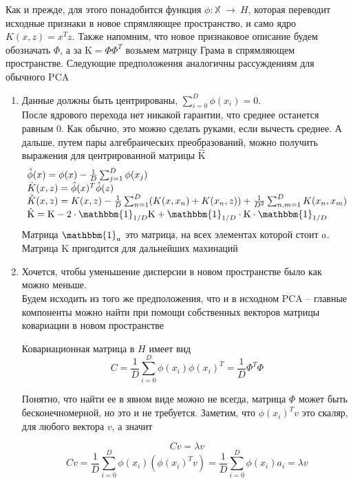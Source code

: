 \documentclass[12pt,fleqn]{article}
\begin{document}
Как и прежде, для этого понадобится функция $\phi: \mathbb{X}~\to~H$, которая переводит исходные признаки в новое спрямляющее пространство, и само ядро $K(x, z) = x^Tz$. Также напомним, что новое признаковое описание будем обозначать $\Phi$, а за $\text{K}=\Phi\Phi^T$ возьмем матрицу Грама в спрямляющем пространстве. Следующие предположения аналогичны рассуждениям для обычного PCA 

\begin{enumerate}
\item Данные должны быть центрированы, $\sum_{i=0}^D \phi(x_i) = 0$. \\ После ядрового перехода нет никакой гарантии, что среднее останется равным 0. Как обычно, это можно сделать руками, если вычесть среднее. А дальше, путем пары алгебраических преобразований, можно получить выражения для центрированной матрицы $\hat{\text{K}}$
\begin{equation}
  \begin{array}{l}
    \hat{\phi}(x) = \phi(x) - \frac{1}{D}\sum_{j=1}^D\phi(x_j) \\
    \hat{K}(x, z) = \hat{\phi}(x)^T\hat{\phi}(z) \\
    \hat{K}(x, z) = K(x, z) - \frac{1}{D}\sum_{n=1}^D (K(x, x_n) + K(x_n, z)) + \frac{1}{D^2}\sum_{n, m=1}^DK(x_n, x_m) \\
    \hat{\text{K}} = \text{K} - 2\cdot\mathbbm{1}_{1/D} \text{K} + \mathbbm{1}_{1/D} \cdot \text{K} \cdot \mathbbm{1}_{1/D}
  \end{array}
\end{equation}
Матрица $\mathbbm{1}_{a}$ это матрица, на всех элементах которой стоит $a$. Матрица $\text{K}$ пригодится для дальнейших махинаций

\break

\item Хочется, чтобы уменьшение дисперсии в новом пространстве было как можно меньше. \\ 
Будем исходить из того же предположения, что и в исходном PCA -- главные компоненты можно найти при помощи собственных векторов матрицы ковариации в новом пространстве

Ковариационная матрица в $H$ имеет вид 
$$
C = \frac{1}{D}\sum_{i=0}^D \phi(x_i) \phi(x_i)^T = \frac{1}{D}\Phi^T\Phi
$$

Понятно, что найти ее в явном виде можно не всегда, матрица $\Phi$ может быть бесконечномерной, но это и не требуется. Заметим, что $\phi(x_i)^T v$ это скаляр, для любого вектора $v$, а значит

$$
Cv = \lambda v
$$
$$
    Cv = \frac{1}{D}\sum_{i=0}^D \phi(x_i) \left(\phi(x_i)^T v \right)= \frac{1}{D}\sum_{i=0}^D \phi(x_i) a_i = \lambda v
$$


\end{enumerate}
\end{document}
